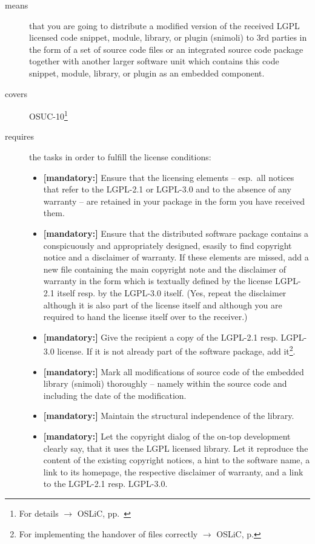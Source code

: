 \begin{description}
\item[means] that you are going to distribute a modified version of the received
LGPL licensed code snippet, module, library, or plugin (snimoli) to 3rd
parties in the form of a set of source code files or an integrated source code
package together with another larger software unit which contains this code
snippet, module, library, or plugin as an embedded component.
\item[covers] OSUC-10\footnote{For details $\rightarrow$ OSLiC, pp.\ \pageref{OSUC-10-DEF}}
\item[requires] the tasks in order to fulfill the license conditions:
\begin{itemize}


  \item \textbf{[mandatory:]} Ensure that the licensing elements -- esp.\ all
  notices that refer to the LGPL-2.1 or LGPL-3.0 and to the absence of any
  warranty -- are retained in your package in the form you have received them.

  \item \textbf{[mandatory:]} Ensure that the distributed software package
  contains a conspicuously and appropriately designed, esasily to find copyright
  notice and a disclaimer of warranty. If these elements are missed, add a new
  file containing the main copyright note and the disclaimer of warranty in the
  form which is textually defined by the license LGPL-2.1 itself resp. by the
  LGPL-3.0 itself. (Yes, repeat the disclaimer although it is also part of the
  license itself and although you are required to hand the license itself over
  to the receiver.)
  
  \item \textbf{[mandatory:]} Give the recipient a copy of the LGPL-2.1 resp.
  LGPL-3.0 license. If it is not already part of the software package, add
  it\footnote{For implementing the handover of files correctly $\rightarrow$
  OSLiC, p. \pageref{DistributingFilesHint}}.
    
  \item \textbf{[mandatory:]} Mark all modifications of source code of the
  embedded library (snimoli) thoroughly --
  namely within the source code and including the date of the modification.

  \item \textbf{[mandatory:]}  Maintain the structural independence of the
  library.
   
  \item \textbf{[mandatory:]} Let the copyright dialog of the on-top development
  clearly say, that it uses the LGPL licensed library. Let it reproduce the
  content of the existing copyright notices, a hint to the software name, a link
  to its homepage, the respective disclaimer of warranty, and a link to the
  LGPL-2.1 resp. LGPL-3.0.
     

\end{itemize}
\end{description}
